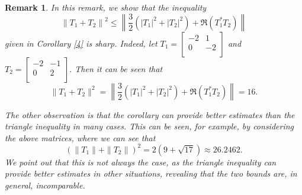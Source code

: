 \documentclass[12pt,twoside,reqno]{amsart}
\newtheorem{remark}{Remark}[section]
\numberwithin{equation}{section}
\begin{document}
\begin{remark}
In this remark, we show that the inequality 
\[{{\left\| {{T}_{1}}+{{T}_{2}} \right\|}^{2}}\le \left\| \frac{3}{2}\left( {{\left| {{T}_{1}} \right|}^{2}}+{{\left| {{T}_{2}} \right|}^{2}} \right)+\Re\left( T_{1}^{*}{{T}_{2}} \right) \right\|\]
given  in Corollary \ref{4} is sharp. Indeed, let $T_1=\left[
\begin{array}{cc}
 -2 & 1 \\
 0 & -2 \\
\end{array}
\right]$ and $T_2=\left[
\begin{array}{cc}
 -2 & -1 \\
 0 & 2 \\
\end{array}
\right].$ Then it can be seen that
\[\|T_1+T_2\|^2= \left\| \frac{3}{2}\left( {{\left| {{T}_{1}} \right|}^{2}}+{{\left| {{T}_{2}} \right|}^{2}} \right)+\Re\left( T_{1}^{*}{{T}_{2}} \right) \right\|=16.\]

The other observation is that the corollary can provide better estimates than the triangle inequality in many cases. This can be seen, for example, by considering the above matrices, where we can see that
\[(\|T_1\|+\|T_2\|)^2=2 (9 + \sqrt{17})\approx 26.2462.\]
We point out that this is not always the case, as the triangle inequality can provide better estimates in other situations, revealing that the two bounds are, in general, incomparable.   
\end{remark}
\end{document}
